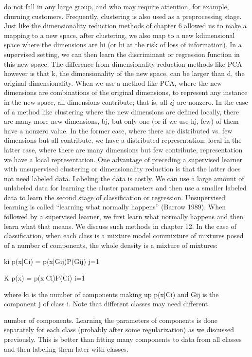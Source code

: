 do not fall in any large group, and who may require attention, for example, churning customers. Frequently, clustering is also used as a preprocessing stage. Just like the dimensionality reduction methods of chapter 6 allowed us to make a mapping to a new space, after clustering, we also map to a new kdimensional space where the dimensions are hi (or bi at the risk of loss of information). In a supervised setting, we can then learn the discriminant or regression function in this new space. The difference from dimensionality reduction methods like PCA however is that k, the dimensionality of the new space, can be larger than d, the original dimensionality. When we use a method like PCA, where the new dimensions are combinations of the original dimensions, to represent any instance in the new space, all dimensions contribute; that is, all zj are nonzero. In the case of a method like clustering where the new dimensions are defined locally, there are many more new dimensions, bj, but only one (or if we use hj, few) of them have a nonzero value. In the former case, where there are distributed vs. few dimensions but all contribute, we have a distributed representation; local in the latter case, where there are many dimensions but few contribute, representation we have a local representation. One advantage of preceding a supervised learner with unsupervised clustering or dimensionality reduction is that the latter does not need labeled data. Labeling the data is costly. We can use a large amount of unlabeled data for learning the cluster parameters and then use a smaller labeled data to learn the second stage of classification or regression. Unsupervised learning is called “learning what normally happens” (Barrow 1989). When followed by a supervised learner, we first learn what normally happens and then learn what that means. We discuss such methods in chapter 12. In the case of classification, when each class is a mixture model commixture of mixtures posed of a number of components, the whole density is a mixture of mixtures:

ki p(x|Ci) = p(x|Gij)P(Gij) j=1

K p(x) = p(x|Ci)P(Ci) i=1

where ki is the number of components making up p(x|Ci) and Gij is the component j of class i. Note that different classes may need different

number of components. Learning the parameters of components is done separately for each class (probably after some regularization) as we discussed previously. This is better than fitting many components to data from all classes and then labeling them later with classes.

